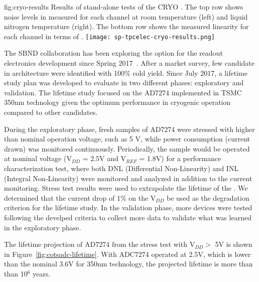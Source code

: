 \begin{dunefigure}
{fig:cryo-results}
{Results of stand-alone tests of the CRYO .  The top row shows noise levels in  measured for each channel at room temperature (left) and liquid nitrogen temperature (right).  The bottom row shows the measured linearity for each channel in terms of . }
\texttt{[image: sp-tpcelec-cryo-results.png]}
\end{dunefigure}

\label{sec:fdsp-tpcelec-design-femb-alt-cots}

The SBND collaboration has been exploring the   option for the  readout electronics development since Spring 2017~\cite{Chen:2018zic}. After a market survey, few candidate  in  architecture were identified with 100\% cold yield. Since July 2017, a lifetime study plan was developed to evaluate   in two different phases: exploratory and validation. The lifetime study focused on the %
 AD7274 implemented in TSMC 350nm  technology given the optimum performance in cryogenic operation compared to other candidates.

During the exploratory phase, fresh samples of   AD7274 were stressed with higher than nominal operation voltage, such as 5 V, while power consumption (current drawn) was monitored continuously. Periodically, the sample would be operated at nominal voltage (V$_{DD}$ = 2.5V and V$_{REF}$ = 1.8V) for a performance characterization test, where both DNL (Differential Non-Linearity) and INL (Integral Non-Linearity)  were monitored and analyzed in addition to the current monitoring. Stress test results were used to extrapolate the lifetime of the  . We determined that the current drop of 1\% on the V$_{DD}$ be used as the degradation criterion for the lifetime study. In the validation phase, more devices were tested following the develped criteria to collect more data to validate what was learned in the exploratory phase.

The lifetime projection of   AD7274 from the stress test with V$_{DD} >$ 5V is shown in Figure~\ref{fig:cotsadc-lifetime}. With ADC7274 operated at 2.5V, which is lower than the nominal 3.6V for 350nm  technology, the projected lifetime is more than than 10$^6$ years.

